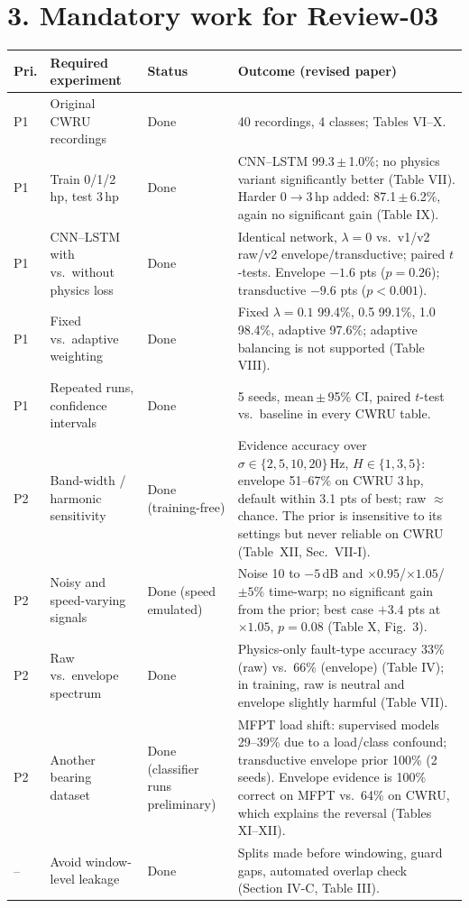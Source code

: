 \documentclass[11pt]{article}
\begin{document}
\section*{3. Mandatory work for Review-03}
\begin{center}
\small
\begin{tabular}{p{0.6cm}p{4.6cm}p{2.0cm}p{8.0cm}}
\toprule
Pri. & Required experiment & Status & Outcome (revised paper) \\
\midrule
P1 & Original CWRU recordings & Done & 40 recordings, 4 classes; Tables VI--X. \\
P1 & Train 0/1/2\,hp, test 3\,hp & Done & CNN--LSTM 99.3\,$\pm$\,1.0\%; no physics variant significantly better (Table VII). Harder 0$\to$3\,hp added: 87.1\,$\pm$\,6.2\%, again no significant gain (Table IX). \\
P1 & CNN--LSTM with vs.\ without physics loss & Done & Identical network, $\lambda=0$ vs.\ v1/v2 raw/v2 envelope/transductive; paired $t$-tests. Envelope $-1.6$ pts ($p=0.26$); transductive $-9.6$ pts ($p<0.001$). \\
P1 & Fixed vs.\ adaptive weighting & Done & Fixed $\lambda=0.1$ 99.4\%, 0.5 99.1\%, 1.0 98.4\%, adaptive 97.6\%; adaptive balancing is not supported (Table VIII). \\
P1 & Repeated runs, confidence intervals & Done & 5 seeds, mean\,$\pm$\,95\% CI, paired $t$-test vs.\ baseline in every CWRU table. \\
\midrule
P2 & Band-width / harmonic sensitivity & Done (training-free) & Evidence accuracy over $\sigma\in\{2,5,10,20\}$\,Hz, $H\in\{1,3,5\}$: envelope 51--67\% on CWRU 3\,hp, default within 3.1 pts of best; raw $\approx$ chance. The prior is insensitive to its settings but never reliable on CWRU (Table~XII, Sec.~VII-I). \\
P2 & Noisy and speed-varying signals & Done (speed emulated) & Noise 10 to $-5$\,dB and $\times0.95$/$\times1.05$/$\pm5\%$ time-warp; no significant gain from the prior; best case $+3.4$ pts at $\times1.05$, $p=0.08$ (Table X, Fig.~3). \\
P2 & Raw vs.\ envelope spectrum & Done & Physics-only fault-type accuracy 33\% (raw) vs.\ 66\% (envelope) (Table IV); in training, raw is neutral and envelope slightly harmful (Table VII). \\
P2 & Another bearing dataset & Done (classifier runs preliminary) & MFPT load shift: supervised models 29--39\% due to a load/class confound; transductive envelope prior 100\% (2 seeds). Envelope evidence is 100\% correct on MFPT vs.\ 64\% on CWRU, which explains the reversal (Tables XI--XII). \\
\midrule
-- & Avoid window-level leakage & Done & Splits made before windowing, guard gaps, automated overlap check (Section IV-C, Table III). \\
\bottomrule
\end{tabular}
\end{center}
\end{document}
